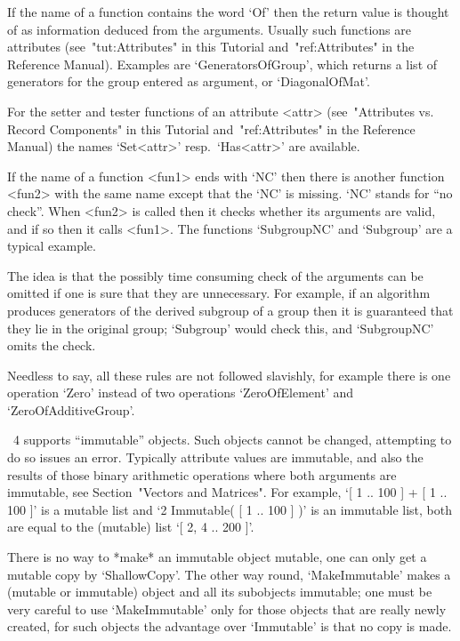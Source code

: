 If the name of a function contains the word `Of' then the return value is
thought of as information deduced from the arguments.
Usually such functions are attributes
(see~"tut:Attributes" in this Tutorial and~"ref:Attributes"
in the Reference Manual).
Examples are `GeneratorsOfGroup', which returns a list of generators for
the group entered as argument, or `DiagonalOfMat'.

For the setter and tester functions of an attribute <attr>
(see~"Attributes vs. Record Components" in this Tutorial
and~"ref:Attributes" in the Reference Manual)
the names `Set<attr>' resp.~`Has<attr>' are available.

If the name of a function <fun1> ends with `NC' then there is another
function <fun2> with the same name except that the `NC' is missing.
`NC' stands for ``no check''.
When <fun2> is called then it checks whether its arguments are valid,
and if so then it calls <fun1>.
The functions `SubgroupNC' and `Subgroup' are a typical example.

The idea is that the possibly time consuming check of the arguments
can be omitted if one is sure that they are unnecessary.
For example, if an algorithm produces generators of the derived subgroup
of a group then it is guaranteed that they lie in the original group;
`Subgroup' would check this, and `SubgroupNC' omits the check.

Needless to say, all these rules are not followed slavishly,
for example there is one operation `Zero' instead of two operations
`ZeroOfElement' and `ZeroOfAdditiveGroup'.



{\GAP}~4 supports ``immutable'' objects.  Such objects cannot be
changed, attempting to do so issues an error.  Typically attribute
values are immutable, and also the results of those binary arithmetic
operations where both arguments are immutable, see Section~"Vectors
and Matrices".  For example, `[ 1 .. 100 ] + [ 1 .. 100 ]' is a
mutable list and `2 \* Immutable( [ 1 .. 100 ] )' is an immutable
list, both are equal to the (mutable) list `[ 2, 4 .. 200 ]'.

There is no way to *make* an immutable object mutable, one can only
get a mutable copy by `ShallowCopy'.  The other way round,
`MakeImmutable' makes a (mutable or immutable) object and all its
subobjects immutable; one must be very careful to use `MakeImmutable'
only for those objects that are really newly created, for such objects
the advantage over `Immutable' is that no copy is made.

